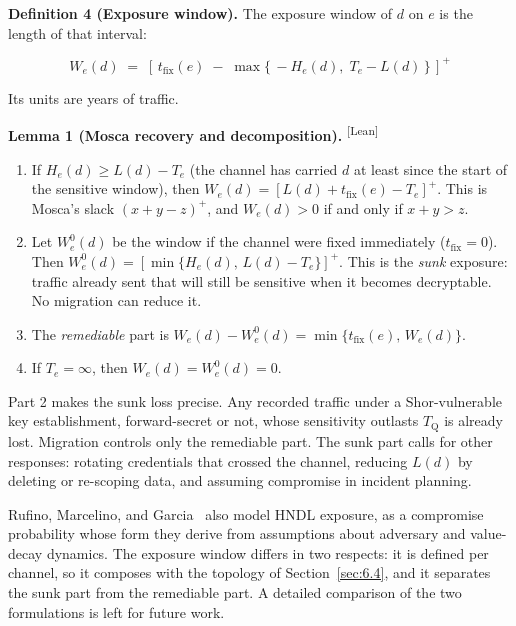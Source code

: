 \documentclass[conference]{IEEEtran}
\newcommand{\Tq}{T_{\mathrm{Q}}}
\newcommand{\tfix}{t_{\mathrm{fix}}}
\newcommand{\pos}[1]{\left[#1\right]^{+}}
\providecommand{\gt}{}\renewcommand{\gt}{>}
\newcommand{\leantag}{\textsuperscript{\textsf{\scriptsize[Lean]}}}
\newenvironment{envblock}{\par\smallskip\noindent\ignorespaces}{\par\smallskip}
\begin{document}
\begin{envblock}

\textbf{Definition 4 (Exposure window).} The exposure window of $d$ on $e$ is the length of that interval:

\[ W_e(d) \;=\; \pos{\, \tfix(e) \;-\; \max\{\, -H_e(d),\; T_e - L(d) \,\}\,} \]

Its units are years of traffic.
\end{envblock}

\begin{envblock}

\textbf{Lemma 1 (Mosca recovery and decomposition).} \leantag{}

\begin{enumerate}
\item If $H_e(d) \ge L(d) - T_e$ (the channel has carried $d$ at least since the start of the sensitive window), then $W_e(d) = \pos{L(d) + \tfix(e) - T_e}$. This is Mosca's slack $(x + y - z)^+$, and $W_e(d) \gt 0$ if and only if $x + y \gt z$.
\item Let $W^0_e(d)$ be the window if the channel were fixed immediately ($\tfix = 0$). Then $W^0_e(d) = \pos{\min\{H_e(d),\, L(d) - T_e\}}$. This is the \emph{sunk} exposure: traffic already sent that will still be sensitive when it becomes decryptable. No migration can reduce it.
\item The \emph{remediable} part is $W_e(d) - W^0_e(d) = \min\{\tfix(e),\, W_e(d)\}$.
\item If $T_e = \infty$, then $W_e(d) = W^0_e(d) = 0$.
\end{enumerate}
\end{envblock}

Part 2 makes the sunk loss precise. Any recorded traffic under a Shor-vulnerable key establishment, forward-secret or not, whose sensitivity outlasts $\Tq$ is already lost. Migration controls only the remediable part. The sunk part calls for other responses: rotating credentials that crossed the channel, reducing $L(d)$ by deleting or re-scoping data, and assuming compromise in incident planning.

Rufino, Marcelino, and Garcia~\cite{rufino2026} also model HNDL exposure, as a compromise probability whose form they derive from assumptions about adversary and value-decay dynamics. The exposure window differs in two respects: it is defined per channel, so it composes with the topology of Section~\ref{sec:6.4}, and it separates the sunk part from the remediable part. A detailed comparison of the two formulations is left for future work.
\end{document}
